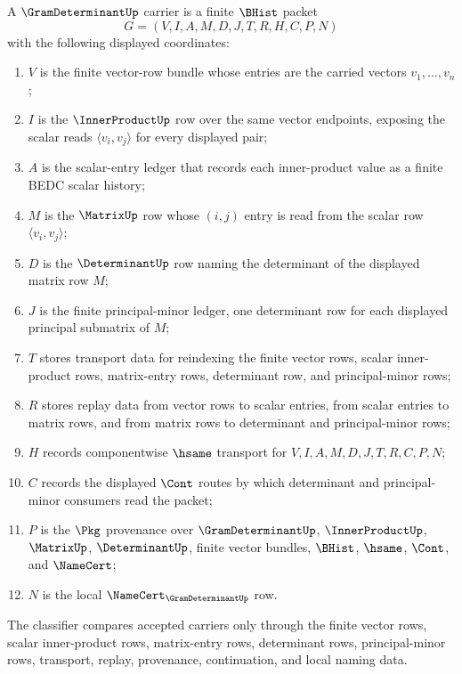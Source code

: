 \begin{definition}
\label{def:gram-determinant-carrier}
A $\GramDeterminantUp$ carrier is a finite $\BHist$ packet
$$
G=(V,I,A,M,D,J,T,R,H,C,P,N)
$$
with the following displayed coordinates:
\begin{enumerate}
\item $V$ is the finite vector-row bundle whose entries are the carried vectors $v_1,\ldots,v_n$;
\item $I$ is the $\InnerProductUp$ row over the same vector endpoints, exposing the scalar reads $\langle v_i,v_j\rangle$ for every displayed pair;
\item $A$ is the scalar-entry ledger that records each inner-product value as a finite BEDC scalar history;
\item $M$ is the $\MatrixUp$ row whose $(i,j)$ entry is read from the scalar row $\langle v_i,v_j\rangle$;
\item $D$ is the $\DeterminantUp$ row naming the determinant of the displayed matrix row $M$;
\item $J$ is the finite principal-minor ledger, one determinant row for each displayed principal submatrix of $M$;
\item $T$ stores transport data for reindexing the finite vector rows, scalar inner-product rows, matrix-entry rows, determinant row, and principal-minor rows;
\item $R$ stores replay data from vector rows to scalar entries, from scalar entries to matrix rows, and from matrix rows to determinant and principal-minor rows;
\item $H$ records componentwise $\hsame$ transport for $V,I,A,M,D,J,T,R,C,P,N$;
\item $C$ records the displayed $\Cont$ routes by which determinant and principal-minor consumers read the packet;
\item $P$ is the $\Pkg$ provenance over $\GramDeterminantUp$, $\InnerProductUp$, $\MatrixUp$, $\DeterminantUp$, finite vector bundles, $\BHist$, $\hsame$, $\Cont$, and $\NameCert$;
\item $N$ is the local $\NameCert_{\GramDeterminantUp}$ row.
\end{enumerate}
The classifier compares accepted carriers only through the finite vector rows, scalar inner-product rows, matrix-entry rows, determinant rows, principal-minor rows, transport, replay, provenance, continuation, and local naming data.
\end{definition}

